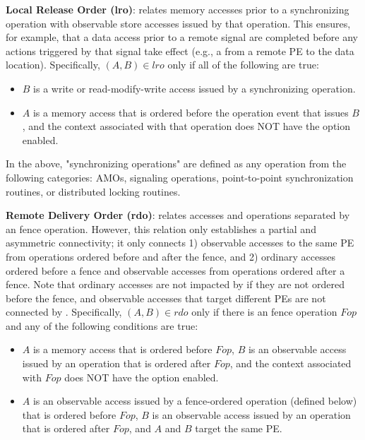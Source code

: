 \textbf{Local Release Order (lro)}:
\relLRO{} relates memory accesses prior to a synchronizing \openshmem operation with observable store accesses issued by that operation. This ensures, for example, that a data access prior to a remote signal are completed before any actions triggered by that signal take effect (e.g., a \PUT{} from a remote \ac{PE} to the data location). Specifically, $(A, B) \in lro$ only if all of the following are true:
\begin{itemize}
    \item $B$ is a write or read-modify-write access issued by a synchronizing \openshmem operation.
    \item $A$ is a memory access that is \relHB{} ordered before the operation event that issues $B$, and the context associated with that operation does NOT have the  option enabled.
\end{itemize}

In the above, "synchronizing \openshmem operations" are defined as any operation from the following categories: \ac{AMO}s, signaling operations, point-to-point synchronization routines, or distributed locking routines.

\textbf{Remote Delivery Order (rdo)}:
\relRDO{} relates accesses and operations separated by an \openshmem fence operation.
    However, this relation only establishes a partial and asymmetric connectivity; it
    only connects 1) observable accesses to the same \ac{PE} from operations \relHB{}
    ordered before and after the fence, and 2) ordinary accesses \relHB{} ordered before
    a fence and observable accesses from operations \relHB{} ordered after a fence.
Note that ordinary accesses are not impacted by \relRDO{} if they are not \relHB{}
    ordered before the fence, and observable accesses that target different \acp{PE} are
    not connected by \relRDO{}.
Specifically, $(A, B) \in rdo$ only if there is an \openshmem fence operation $Fop$ and
    any of the following conditions are true:
\begin{itemize}
    \item $A$ is a memory access that is \relHB{} ordered before $Fop$, $B$ is an
        observable access issued by an operation that is \relHB{} ordered after $Fop$,
        and the context associated with $Fop$ does NOT have the
         option enabled.
    \item $A$ is an observable access issued by a fence-ordered operation (defined
        below) that is \relHB{} ordered before $Fop$, $B$ is an observable access issued
        by an operation that is \relHB{} ordered after $Fop$, and $A$ and $B$ target the
        same \ac{PE}.
\end{itemize}

